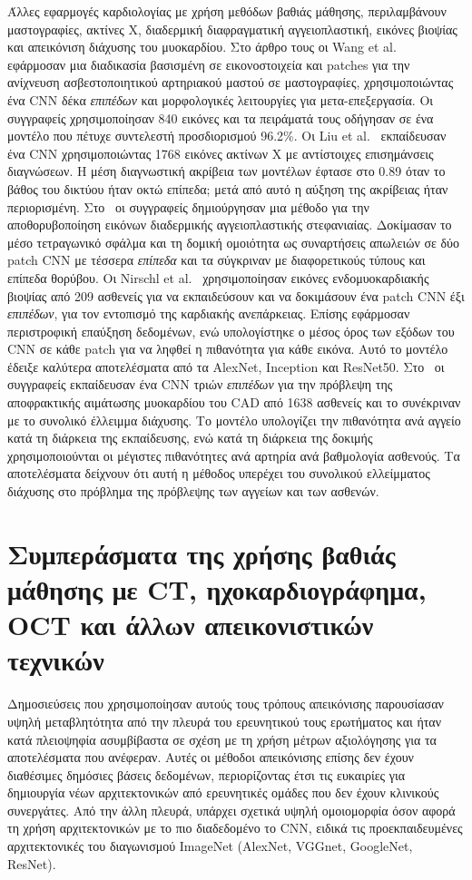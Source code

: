 Άλλες εφαρμογές καρδιολογίας με χρήση μεθόδων βαθιάς μάθησης, περιλαμβάνουν μαστογραφίες, ακτίνες Χ, διαδερμική διαφραγματική αγγειοπλαστική, εικόνες βιοψίας και απεικόνιση διάχυσης του μυοκαρδίου.
Στο άρθρο τους οι Wang et al.~\cite{wang2017detecting} εφάρμοσαν μια διαδικασία βασισμένη σε εικονοστοιχεία και patches για την ανίχνευση ασβεστοποιητικού αρτηριακού μαστού σε μαστογραφίες, χρησιμοποιώντας ένα CNN δέκα \textit{επιπέδων} και μορφολογικές λειτουργίες για μετα-επεξεργασία.
Οι συγγραφείς χρησιμοποίησαν 840 εικόνες και τα πειράματά τους οδήγησαν σε ένα μοντέλο που πέτυχε συντελεστή προσδιορισμού 96.2\%.
Οι Liu et al.~\cite{liu2017coronary} εκπαίδευσαν ένα CNN χρησιμοποιώντας 1768 εικόνες ακτίνων Χ με αντίστοιχες επισημάνσεις διαγνώσεων.
Η μέση διαγνωστική ακρίβεια των μοντέλων έφτασε στο 0.89 όταν το βάθος του δικτύου ήταν οκτώ επίπεδα; μετά από αυτό η αύξηση της ακρίβειας ήταν περιορισμένη.
Στο~\cite{pavoni2017image} οι συγγραφείς δημιούργησαν μια μέθοδο για την αποθορυβοποίηση εικόνων διαδερμικής αγγειοπλαστικής στεφανιαίας.
Δοκίμασαν το μέσο τετραγωνικό σφάλμα και τη δομική ομοιότητα ως συναρτήσεις απωλειών σε δύο patch CNN με τέσσερα \textit{επίπεδα} και τα σύγκριναν με διαφορετικούς τύπους και επίπεδα θορύβου.
Οι Nirschl et al.~\cite{nirschl2018deep} χρησιμοποίησαν εικόνες ενδομυοκαρδιακής βιοψίας από 209 ασθενείς για να εκπαιδεύσουν και να δοκιμάσουν ένα patch CNN έξι \textit{επιπέδων}, για τον εντοπισμό της καρδιακής ανεπάρκειας.
Επίσης εφάρμοσαν περιστροφική επαύξηση δεδομένων, ενώ υπολογίστηκε ο μέσος όρος των εξόδων του CNN σε κάθε patch για να ληφθεί η πιθανότητα για κάθε εικόνα.
Αυτό το μοντέλο έδειξε καλύτερα αποτελέσματα από τα AlexNet, Inception και ResNet50.
Στο~\cite{betancur2018deep} οι συγγραφείς εκπαίδευσαν ένα CNN τριών \textit{επιπέδων} για την πρόβλεψη της αποφρακτικής αιμάτωσης μυοκαρδίου του CAD από 1638 ασθενείς και το συνέκριναν με το συνολικό έλλειμμα διάχυσης.
Το μοντέλο υπολογίζει την πιθανότητα ανά αγγείο κατά τη διάρκεια της εκπαίδευσης, ενώ κατά τη διάρκεια της δοκιμής χρησιμοποιούνται οι μέγιστες πιθανότητες ανά αρτηρία ανά βαθμολογία ασθενούς.
Τα αποτελέσματα δείχνουν ότι αυτή η μέθοδος υπερέχει του συνολικού ελλείμματος διάχυσης στο πρόβλημα της πρόβλεψης των αγγείων και των ασθενών.

\section{Συμπεράσματα της χρήσης βαθιάς μάθησης με CT, ηχοκαρδιογράφημα, OCT και άλλων απεικονιστικών τεχνικών}
Δημοσιεύσεις που χρησιμοποίησαν αυτούς τους τρόπους απεικόνισης παρουσίασαν υψηλή μεταβλητότητα από την πλευρά του ερευνητικού τους ερωτήματος και ήταν κατά πλειοψηφία ασυμβίβαστα σε σχέση με τη χρήση μέτρων αξιολόγησης για τα αποτελέσματα που ανέφεραν.
Αυτές οι μέθοδοι απεικόνισης επίσης δεν έχουν διαθέσιμες δημόσιες βάσεις δεδομένων, περιορίζοντας έτσι τις ευκαιρίες για δημιουργία νέων αρχιτεκτονικών από ερευνητικές ομάδες που δεν έχουν κλινικούς συνεργάτες.
Από την άλλη πλευρά, υπάρχει σχετικά υψηλή ομοιομορφία όσον αφορά τη χρήση αρχιτεκτονικών με το πιο διαδεδομένο το CNN, ειδικά τις προεκπαιδευμένες αρχιτεκτονικές του διαγωνισμού ImageNet (AlexNet, VGGnet, GoogleNet, ResNet).

